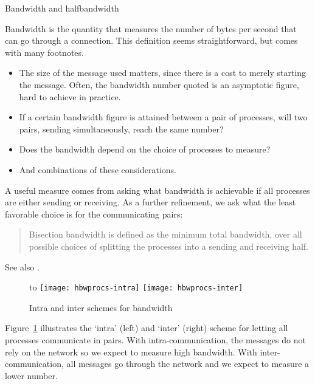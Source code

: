 
 {Bandwidth and halfbandwidth}

Bandwidth is the quantity that measures the number of bytes per second that
can go through a connection.
This definition seems straightforward, but comes with many footnotes.
\begin{itemize}
\item The size of the message used matters, since there is a 
  cost to merely starting the message. Often, the bandwidth number quoted
  is an asymptotic figure, hard to achieve in practice.
\item If a certain bandwidth figure is attained between a pair of processes,
  will two pairs, sending simultaneously, reach the same number?
\item Does the bandwidth depend on the choice of processes to measure?
\item And combinations of these considerations.
\end{itemize}

A useful measure comes from asking what bandwidth is achievable if all processes
are either sending or receiving.
As a further refinement, we ask what the least favorable choice is
for the communicating pairs:
\begin{quote}
  Bisection bandwidth is defined as the minimum total bandwidth,
  over all possible choices of splitting the processes into
  a sending and receiving half.
\end{quote}
See also .

\begin{figure}[ht]
  \hbox to \textwidth \bgroup \hss %
  \texttt{[image: hbwprocs-intra]}
  \hss  %
  \texttt{[image: hbwprocs-inter]}
  \hss  %
  \egroup  %
  \caption{Intra and inter schemes for bandwidth}
  \label{fig:interintra}
\end{figure}

Figure~\ref{fig:interintra} illustrates the `intra' (left)
and `inter' (right) scheme for letting all processes
communicate in pairs.
With intra-communication, the messages do not rely on the network
so we expect to measure high bandwidth.
With inter-communication, all messages go through the network
and we expect to measure a lower number.


